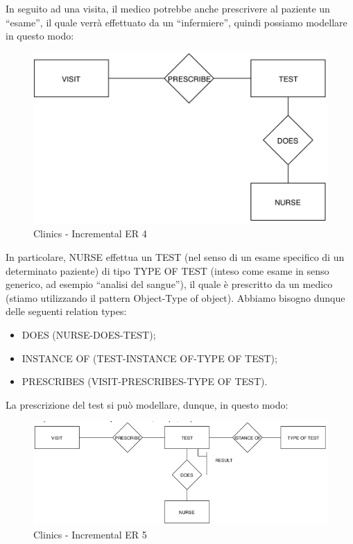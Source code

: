 In seguito ad una visita, il medico potrebbe anche prescrivere al paziente un “esame”, il quale verrà effettuato da un “infermiere”, quindi possiamo modellare in questo modo:   

\begin{center}
\begin{figure}[H]
\centering
\includegraphics[scale=1]{figures/clinics_incER4.png}
\caption{Clinics - Incremental ER 4}
\end{figure}
\end{center}

In particolare, NURSE effettua un TEST (nel senso di un esame specifico di un determinato paziente) di tipo TYPE OF TEST (inteso come esame in senso generico, ad esempio “analisi del sangue”), il quale è prescritto da un medico (stiamo utilizzando il pattern Object-Type of object). 
Abbiamo bisogno dunque delle seguenti relation types:

\begin{itemize}

\item DOES (NURSE-DOES-TEST);
\item INSTANCE OF (TEST-INSTANCE OF-TYPE OF TEST);
\item PRESCRIBES (VISIT-PRESCRIBES-TYPE OF TEST).

\end{itemize}
	
La prescrizione del test si può modellare, dunque, in questo modo:

\begin{center}
\begin{figure}[H]
\centering
\includegraphics[scale=0.8]{figures/clinics_incER5.png}
\caption{Clinics - Incremental ER 5}
\end{figure}
\end{center}

